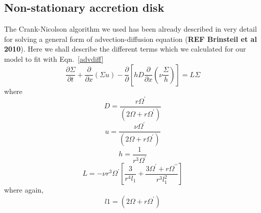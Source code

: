 \documentclass[useAMS,usenatbib]{mn2e}
\newcommand{\mref}[1]{\textbf{REF #1}}
\begin{document}
\subsection{Non-stationary accretion disk}
The Crank-Nicolson algorithm we used has been already described in very detail for solving a general form of advection-diffusion equation (\mref{Brinsteil et al 2010}). Here we shall describe the different terms which we calculated for our model to fit with Eqn.~\ref{advdiff}  
\begin{equation}
\frac{\partial\Sigma}{\partial t} + \frac{\partial}{\partial x}(\Sigma u) - \frac{\partial}{\partial}\left[h D\frac{\partial}{\partial x}\left(\nu\frac{\Sigma}{h}\right)\right] = L\Sigma
\label{advdiff}
\end{equation}
where
\begin{equation}
D = \frac{r\Omega^\prime}{\left(2\Omega + r\Omega^\prime\right)}
\label{D}
\end{equation}
\begin{equation}
u = \frac{\nu\Omega^\prime}{\left(2\Omega + r\Omega^\prime\right)}
\end{equation}
\begin{equation}
h = \frac{1}{r^3\Omega^\prime}
\end{equation}
\begin{equation}
L = -\nu r^3\Omega^\prime\left[\frac{3}{r^4 l_1} +\frac{3\Omega^\prime + r\Omega^{\prime\prime}}{r^3l_1^2}\right]
\end{equation}
where again,
\begin{equation}
l1 = (2\Omega + r\Omega^\prime)
\end{equation}
\label{lastpage}
\end{document}
